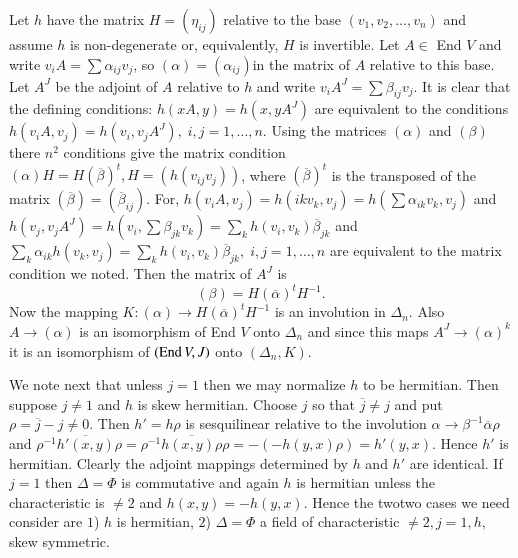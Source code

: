 \begin{enumerate}[I.]
Let $h$ have the matrix $H=(\eta_{ij})$ relative to the base $(v_1,
v_2,\ldots,v_n)$ and assume $h$ is non-degenerate or, equivalently,
$H$ is invertible. Let $A\in$ End $V$ and write $v_i
A=\sum \alpha_{ij}v_j$, so $(\alpha)=(\alpha_{ij})$\pageoriginale in
the matrix of $A$ relative to this base. Let $A^{J}$ be the adjoint of
$A$ relative to $h$ and write $v_iA^{J}=\sum\beta_{ij}v_j$. It is
clear that the defining conditions: $h(x A,y)=h(x,y A^{J})$ are
equivalent to the conditions $h(v_i A,v_j)=h(v_i,v_jA^{J}),\;
i,j=1,\ldots,n$. Using the matrices $(\alpha)$ and $(\beta)$ there
$n^{2}$ conditions give the matrix condition
$(\alpha)H=H(\overline{\beta})^{t}, H=(h(v_{ij}v_j))$, where
$(\overline{\beta})^{t}$ is the transposed of the matrix
$(\overline{\beta})=(\overline{\beta}_{ij})$. For, $h(v_iA,v_j)=h(ik
v_k, v_j)=h(\sum \alpha_{ik}v_{k},v_{j})$ and $h(v_j,v_j
A^{J})=h(v_i, \sum \beta_{jk} v_k)=\sum\limits_{k}h(v_i,
v_k)\overline{\beta}_{jk}$ and $\sum\limits_{k}\alpha_{ik}h(v_k,
v_j)=\sum\limits_{k}h(v_i, v_k)\overline{\beta}_{jk},\;
i,j=1,\ldots,n$ 
are equivalent to the matrix condition we noted. Then the matrix of
$A^{J}$ is 
\begin{equation*}
(\beta)=H(\overline{\alpha})^{t}H^{-1}.\tag{10}\label{c0:eq10}
\end{equation*}
Now the mapping $K:(\alpha)\to H(\overline{\alpha})^{t} H^{-1}$ is an
involution in $\Delta_n$. Also $A\to (\alpha)$ is an isomorphism of
End $V$ onto $\Delta_n$ and since this maps $A^{J}\to (\alpha)^{k}$ it
is an isomorphism of $(\operatorname{End} V, J)$ onto $(\Delta_n, K)$. 

We note next that unless $j=1$ then we may normalize $h$ to be
hermitian. Then suppose $j\neq1$ and $h$ is skew hermitian. Choose $j$
so that $\overline{j}\neq j$ and put $\rho=\overline{j}-j\neq 0$. Then
$h'=h \rho$ is sesquilinear relative to the involution
$\alpha\to \beta^{-1}\overline{\alpha}\rho$ and
$\rho^{-1}\overline{h'(x,y)}\rho=\rho^{-1}\overline{h(x,y)\rho}\rho=-(-h(y,x)\rho)=h'(y,x)$. Hence
$h'$ is hermitian. Clearly the adjoint mappings determined by $h$ and
$h'$ are identical. If $j=1$ then $\Delta=\Phi$ is commutative and
again $h$ is hermitian unless the characteristic is $\neq 2$ and
$h(x,y)=-h(y, x)$. Hence the two\pageoriginale two cases we need
consider are $1$) $h$ is hermitian, $2$) $\Delta=\Phi$ a field of
characteristic $\neq 2, j=1, h$, skew symmetric. 


\end{enumerate}
